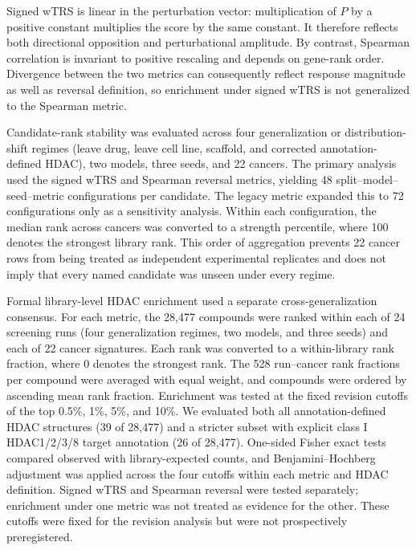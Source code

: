 \begin{roundtworevision}
Signed wTRS is linear in the perturbation vector: multiplication of $P$ by a positive constant multiplies the score by the same constant. It therefore reflects both directional opposition and perturbational amplitude. By contrast, Spearman correlation is invariant to positive rescaling and depends on gene-rank order. Divergence between the two metrics can consequently reflect response magnitude as well as reversal definition, so enrichment under signed wTRS is not generalized to the Spearman metric.
\end{roundtworevision}

Candidate-rank stability was evaluated across four generalization or distribution-shift regimes (leave drug, leave cell line, scaffold, and corrected annotation-defined HDAC), two models, three seeds, and 22 cancers. The primary analysis used the signed wTRS and Spearman reversal metrics, yielding 48 split--model--seed--metric configurations per candidate. The legacy metric expanded this to 72 configurations only as a sensitivity analysis. Within each configuration, the median rank across cancers was converted to a strength percentile, where 100 denotes the strongest library rank. This order of aggregation prevents 22 cancer rows from being treated as independent experimental replicates and does not imply that every named candidate was unseen under every regime.

Formal library-level HDAC enrichment used a separate cross-generalization consensus. For each metric, the 28,477 compounds were ranked within each of 24 screening runs (four generalization regimes, two models, and three seeds) and each of 22 cancer signatures. Each rank was converted to a within-library rank fraction, where 0 denotes the strongest rank. The 528 run--cancer rank fractions per compound were averaged with equal weight, and compounds were ordered by ascending mean rank fraction. Enrichment was tested at the fixed revision cutoffs of the top 0.5\%, 1\%, 5\%, and 10\%. We evaluated both all annotation-defined HDAC structures (39 of 28,477) and a stricter subset with explicit class I HDAC1/2/3/8 target annotation (26 of 28,477). One-sided Fisher exact tests compared observed with library-expected counts, and Benjamini--Hochberg adjustment was applied across the four cutoffs within each metric and HDAC definition. Signed wTRS and Spearman reversal were tested separately; enrichment under one metric was not treated as evidence for the other. These cutoffs were fixed for the revision analysis but were not prospectively preregistered.

